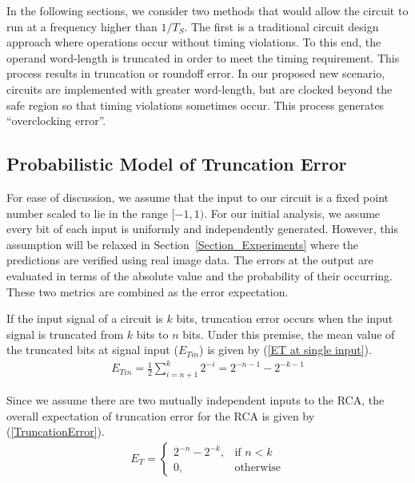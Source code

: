 \documentclass[prodmode,acmtrets]{acmsmall} %
\begin{document}
In the following sections, we consider two methods that would allow the circuit to run at a frequency higher than $1/{T_S}$. The first is a traditional circuit design approach where operations occur without timing violations. To this end, the operand word-length is truncated in order to meet the timing requirement. This process results in truncation or roundoff error. In our proposed new scenario, circuits are implemented with greater word-length, but are clocked beyond the safe region so that timing violations sometimes occur. This process generates ``overclocking error''.

\subsection{Probabilistic Model of Truncation Error}\label{section_RCA_TruncationError}
For ease of discussion, we assume that the input to our circuit is a fixed point number scaled to lie in the range $[-1,1)$. For our initial analysis, we assume every bit of each input is uniformly and independently generated. However, this assumption will be relaxed in Section~\ref{Section_Experiments} where the predictions are verified using real image data. The errors at the output are evaluated in terms of the absolute value and the probability of their occurring. These two metrics are combined as the error expectation.

If the input signal of a circuit is $k$ bits, truncation error occurs when the input signal is truncated from $k$ bits to $n$ bits. Under this premise, the mean value of the truncated bits at signal input ($E_{Tin}$) is given by (\ref{ET at single input}).
%
\begin{eqnarray}\label{ET at single input}
    E_{Tin} = \frac{1}{2}\sum_{i=n+1}^{k}2^{-i} = 2^{-n-1}-2^{-k-1}
\end{eqnarray}

Since we assume there are two mutually independent inputs to the RCA, the overall expectation of truncation error for the RCA is given by (\ref{TruncationError}).
%
\begin{eqnarray}\label{TruncationError}
  E_T=\left\{
    \begin{matrix}
        2^{-n}-2^{-k}, & \textrm{if $n<k$}\\
        0, & \textrm{otherwise}
    \end{matrix}
  \right.
\end{eqnarray}
\end{document}
